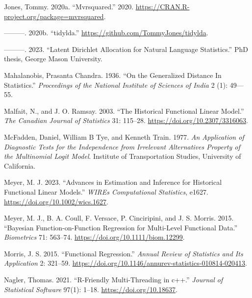 \begin{CSLReferences}{1}{0}
\leavevmode{}%
Jones, Tommy. 2020a. {``Mvrsquared.''} 2020. \url{https://CRAN.R-project.org/package=mvrsquared}.

\leavevmode{}%
---------. 2020b. {``{tidylda}.''} \url{https://github.com/TommyJones/tidylda}.

\leavevmode{}%
---------. 2023. {``Latent Dirichlet Allocation for Natural Language Statistics.''} PhD thesis, George Mason University.

\leavevmode{}%
Mahalanobis, Prasanta Chandra. 1936. {``{On the Generalized Distance In Statistics}.''} \emph{Proceedings of the National Institute of Sciences of India} 2 (1): 49---55.

\leavevmode{}%
Malfait, N., and J. O. Ramsay. 2003. {``The Historical Functional Linear Model.''} \emph{The Canadian Journal of Statistics} 31: 115--28. \url{https://doi.org/10.2307/3316063}.

\leavevmode{}%
McFadden, Daniel, William B Tye, and Kenneth Train. 1977. \emph{An Application of Diagnostic Tests for the Independence from Irrelevant Alternatives Property of the Multinomial Logit Model}. Institute of Transportation Studies, University of California.

\leavevmode{}%
Meyer, M. J. 2023. {``Advances in Estimation and Inference for Historical Functional Linear Models.''} \emph{WIREs Computational Statistics}, e1627. \url{https://doi.org/10.1002/wics.1627}.

\leavevmode{}%
Meyer, M. J., B. A. Coull, F. Versace, P. Cinciripini, and J. S. Morris. 2015. {``Bayesian Function-on-Function Regression for Multi-Level Functional Data.''} \emph{Biometrics} 71: 563--74. \url{https://doi.org/10.1111/biom.12299}.

\leavevmode{}%
Morris, J. S. 2015. {``Functional Regression.''} \emph{Annual Review of Statistics and Its Application} 2: 321--59. \url{https://doi.org/10.1146/annurev-statistics-010814-020413}.

\leavevmode{}%
Nagler, Thomas. 2021. {``R-Friendly Multi-Threading in c++.''} \emph{Journal of Statistical Software} 97(1): 1--18. \url{https://doi.org/10.18637}.


\end{CSLReferences}

